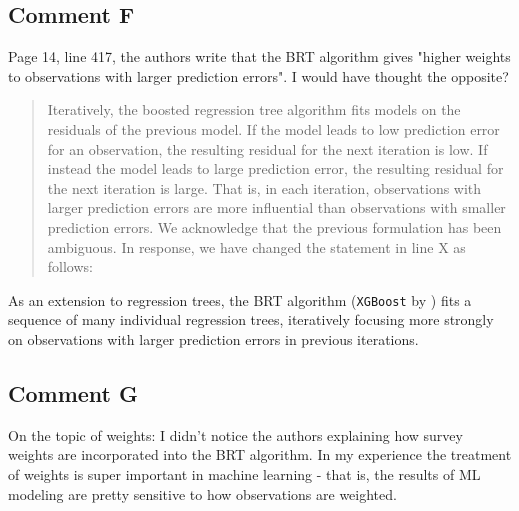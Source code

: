 \documentclass[11pt]{article}
\newenvironment{response}
{\begin{quote}\color{black}}
{\end{quote}}
\begin{document}
\subsection*{Comment F}\label{comment_R1_F}

\begin{commentbox}
    Page 14, line 417, the authors write that the BRT algorithm gives "higher weights to observations with larger prediction errors". I would have thought the opposite?
\end{commentbox}

\begin{response}

Iteratively, the boosted regression tree algorithm fits models on the residuals of the previous model. If the model leads to low prediction error for an observation, the resulting residual for the next iteration is low. If instead the model leads to large prediction error, the resulting residual for the next iteration is large. That is, in each iteration, observations with larger prediction errors are more influential than observations with smaller prediction errors. We acknowledge that the previous formulation has been ambiguous. In response, we have changed the statement in line X as follows:
\end{response}

\begin{revisionbox}
    As an extension to regression trees, the BRT algorithm (\texttt{XGBoost} by \textcite{Chen.2016}) fits a sequence of many individual regression trees, iteratively focusing more strongly on observations with larger prediction errors in previous iterations.
\end{revisionbox}

\subsection*{Comment G}\label{comment_R1_G}

\begin{commentbox}
    On the topic of weights: I didn't notice the authors explaining how survey weights are incorporated into the BRT algorithm. In my experience the treatment of weights is super important in machine learning - that is, the results of ML modeling are pretty sensitive to how observations are weighted.
\end{commentbox}
\end{document}
